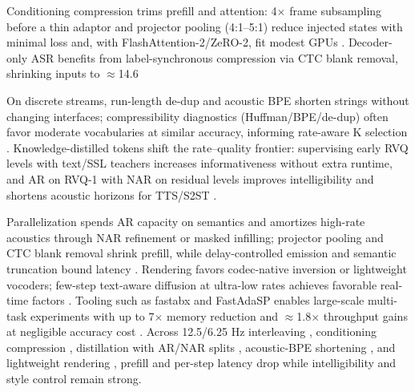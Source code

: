 \documentclass{article}
\begin{document}
Conditioning compression trims prefill and attention: 4$\times$ frame subsampling before a thin adaptor and projector pooling (4:1--5:1) reduce injected states with minimal loss and, with FlashAttention-2/ZeRO-2, fit modest GPUs \cite{wang2023slmbridgethingapbetweenspeechtextfoundat,nguyen2025qwenvsgemmaintegrationwhispercomparative}. Decoder-only ASR benefits from label-synchronous compression via CTC blank removal, shrinking inputs to $\approx$14.6%

On discrete streams, run-length de-dup and acoustic BPE shorten strings without changing interfaces; compressibility diagnostics (Huffman/BPE/de-dup) often favor moderate vocabularies at similar accuracy, informing rate-aware K selection \cite{vashishth2024stabspeechtokenizerassessmentbenchmark}. Knowledge-distilled tokens shift the rate--quality frontier: supervising early RVQ levels with text/SSL teachers increases informativeness without extra runtime, and AR on RVQ-1 with NAR on residual levels improves intelligibility and shortens acoustic horizons for TTS/S2ST \cite{ahasan2025dmcodecdistillingmultimodalrepresentatio,peng2024mslms2stmultitaskspeechlanguagemodeltext}.

Parallelization spends AR capacity on semantics and amortizes high-rate acoustics through NAR refinement or masked infilling; projector pooling and CTC blank removal shrink prefill, while delay-controlled emission and semantic truncation bound latency \cite{guo2025streamuniachievingstreamingspeechtransla}. Rendering favors codec-native inversion or lightweight vocoders; few-step text-aware diffusion at ultra-low rates achieves favorable real-time factors \cite{wang2025tadicodectextawarediffusionspeechtokeniz}. Tooling such as fastabx and FastAdaSP enables large-scale multi-task experiments with up to 7$\times$ memory reduction and $\approx$1.8$\times$ throughput gains at negligible accuracy cost \cite{poli2025fastabxlibraryefficientcomputationabxdis,lu2024fastadaspmultitaskadaptedefficientinfere}. Across 12.5/6.25 Hz interleaving \cite{zeng2024scalingspeechtextpretrainingsyntheticint}, conditioning compression \cite{wang2023slmbridgethingapbetweenspeechtextfoundat,nguyen2025qwenvsgemmaintegrationwhispercomparative,tsunoo2024decoderonlyarchitecturespeechrecognition}, distillation with AR/NAR splits \cite{ahasan2025dmcodecdistillingmultimodalrepresentatio,peng2024mslms2stmultitaskspeechlanguagemodeltext}, acoustic-BPE shortening \cite{vashishth2024stabspeechtokenizerassessmentbenchmark}, and lightweight rendering \cite{wang2025tadicodectextawarediffusionspeechtokeniz}, prefill and per-step latency drop while intelligibility and style control remain strong.
\end{document}

